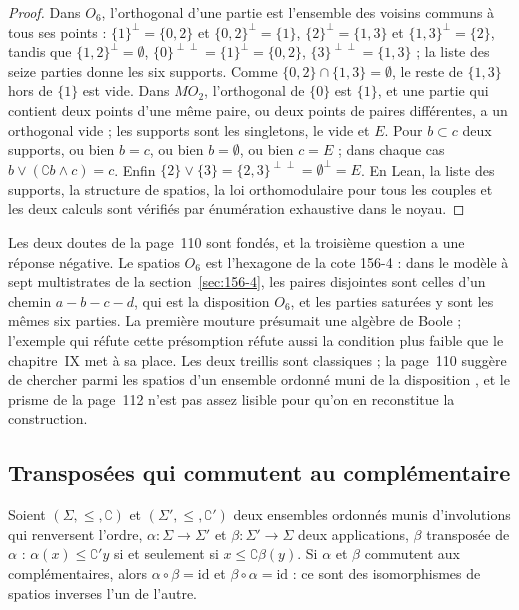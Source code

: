\begin{proof}
Dans $O_6$, l'orthogonal d'une partie est l'ensemble des voisins communs à tous ses points : $\{1\}^{\perp} = \{0,2\}$ et $\{0,2\}^{\perp} = \{1\}$, $\{2\}^{\perp} = \{1,3\}$ et $\{1,3\}^{\perp} = \{2\}$, tandis que $\{1,2\}^{\perp} = \emptyset$, $\{0\}^{\perp\perp} = \{1\}^{\perp} = \{0,2\}$, $\{3\}^{\perp\perp} = \{1,3\}$ ; la liste des seize parties donne les six supports. Comme $\{0,2\} \cap \{1,3\} = \emptyset$, le reste de $\{1,3\}$ hors de $\{1\}$ est vide. Dans $MO_2$, l'orthogonal de $\{0\}$ est $\{1\}$, et une partie qui contient deux points d'une même paire, ou deux points de paires différentes, a un orthogonal vide ; les supports sont les singletons, le vide et $E$. Pour $b \subset c$ deux supports, ou bien $b = c$, ou bien $b = \emptyset$, ou bien $c = E$ ; dans chaque cas $b \vee (\complement b \wedge c) = c$. Enfin $\{2\} \vee \{3\} = \{2,3\}^{\perp\perp} = \emptyset^{\perp} = E$. En Lean, la liste des supports, la structure de spatios, la loi orthomodulaire pour tous les couples et les deux calculs sont vérifiés par énumération exhaustive dans le noyau.
\end{proof}

\begin{remarque}
Les deux doutes de la page~110 sont fondés, et la troisième question a une réponse négative. Le spatios $O_6$ est l'hexagone de la cote 156-4 : dans le modèle à sept multistrates de la section~\ref{sec:156-4}, les paires disjointes sont celles d'un chemin $a - b - c - d$, qui est la disposition $O_6$, et les parties saturées y sont les mêmes six parties. La première mouture présumait une algèbre de Boole ; l'exemple qui réfute cette présomption réfute aussi la condition plus faible que le chapitre~IX met à sa place. Les deux treillis sont classiques ; la page~110 suggère de chercher parmi les spatios d'un ensemble ordonné muni de la disposition , et le prisme de la page~112 n'est pas assez lisible pour qu'on en reconstitue la construction.
\end{remarque}

\subsection*{Transposées qui commutent au complémentaire}

\begin{encadre}
\begin{theoreme}
Soient $(\Sigma, \leq, \complement)$ et $(\Sigma', \leq, \complement')$ deux ensembles ordonnés munis d'involutions qui renversent l'ordre, $\alpha : \Sigma \to \Sigma'$ et $\beta : \Sigma' \to \Sigma$ deux applications, $\beta$ transposée de $\alpha$ : $\alpha(x) \leq \complement' y$ si et seulement si $x \leq \complement \beta(y)$. Si $\alpha$ et $\beta$ commutent aux complémentaires, alors $\alpha \circ \beta = \mathrm{id}$ et $\beta \circ \alpha = \mathrm{id}$ : ce sont des isomorphismes de spatios inverses l'un de l'autre.
\end{theoreme}
\end{encadre}

